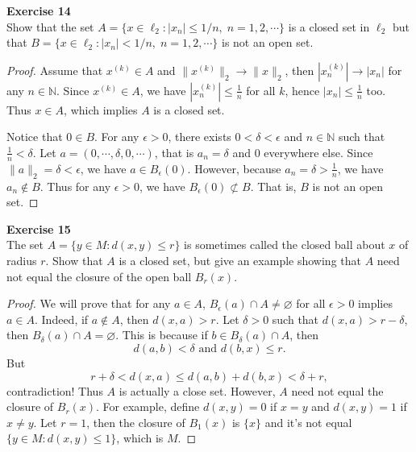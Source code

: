 \documentclass[12pt, a4paper]{article}
\theoremstyle{plain}
\newcommand{\N}{\mathbb{N}}
\newenvironment{exercise}[2][Exercise]
    { \begin{mdframed}[backgroundcolor=gray!20] \textbf{#1 #2} \\}
    {  \end{mdframed}}
\begin{document}
\pagebreak

\begin{exercise}{14}
Show that the set $A=\{x\in\ell_2 : |x_n|\leq 1/n,\; n=1,2,\cdots \}$ is a closed set in $\ell_2$ but that $B=\{x\in\ell_2:|x_n|<1/n,\; n=1,2,\cdots\}$ is not an open set.
\end{exercise}
	\begin{proof}
	Assume that $x^{(k)}\in A$ and $\|x^{(k)}\|_2\rightarrow \|x\|_2$, then $|x_n^{(k)}|\rightarrow |x_n|$ for any $n\in\N$. Since $x^{(k)}\in A$, we have $|x_n^{(k)}|\leq \frac{1}{n}$ for all $k$, hence $|x_n|\leq \frac{1}{n}$ too. Thus $x\in A$, which implies $A$ is a closed set.
	
	Notice that $0\in B$. For any $\epsilon>0$, there exists $0<\delta <\epsilon$ and $n\in\N$ such that $\frac{1}{n}<\delta$. Let $a=(0,\cdots,\delta,0,\cdots)$, that is $a_n=\delta$ and $0$ everywhere else. Since $\|a\|_2=\delta<\epsilon$, we have $a\in B_\epsilon(0)$. However, because $a_n=\delta>\frac{1}{n}$, we have $a_n\notin B$. Thus for any $\epsilon>0$, we have $B_\epsilon(0)\not\subset B$. That is, $B$ is not an open set.
	\end{proof}

\begin{exercise}{15}
The set $A=\{y\in M:d(x,y)\leq r\}$ is sometimes called the closed ball about $x$ of radius $r$. Show that $A$ is a closed set, but give an example showing that $A$ need not equal the closure of the open ball $B_r(x)$.
\end{exercise}
    \begin{proof}
    We will prove that for any $a\in A$, $B_\epsilon(a)\cap A\neq \varnothing$ for all $\epsilon >0$ implies $a\in A$. Indeed, if $a\notin A$, then $d(x,a)>r$. Let $\delta >0$ such that $d(x,a)>r-\delta$, then $B_\delta (a)\cap A=\varnothing$. This is because if $b\in B_\delta(a)\cap A$, then
    \[
    d(a,b)<\delta \text{ and } d(b,x)\leq r.
    \]
    But
    \[
    r+\delta < d(x,a)\leq d(a,b)+d(b,x)<\delta +r,
    \]
    contradiction! Thus $A$ is actually a close set. However, $A$ need not equal the closure of $B_r(x)$. For example, define $d(x,y)=0$ if $x=y$ and $d(x,y)=1$ if $x\neq y$. Let $r=1$, then the closure of $B_1(x)$ is $\{x\}$ and it's not equal $\{y\in M: d(x,y)\leq 1\}$, which is $M$.
    \end{proof}
    
\end{document}
